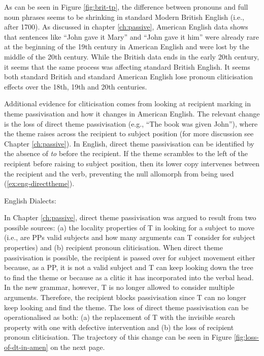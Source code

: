 	As can be seen in Figure \ref{fig:brit-tp}, the difference between pronouns and full noun phrases seems to be shrinking in standard Modern British English (i.e., after 1700). As discussed in chapter \ref{ch:passive}, American English data shows that sentences like ``John gave it Mary'' and ``John gave it him'' were already rare at the beginning of the 19th century in American English and were lost by the middle of the 20th century. While the British data ends in the early 20th century, it seems that the same process was affecting standard British English. It seems both standard British and standard American English lose pronoun cliticisation effects over the 18th, 19th and 20th centuries.

	Additional evidence for cliticisation comes from looking at recipient marking in theme passivisation and how it changes in American English. The relevant change is the loss of direct theme passivisation (e.g., ``The book was given John''), where the theme raises across the recipient to subject position (for more discussion see Chapter \ref{ch:passive}). In English, direct theme passivisation can be identified by the absence of \textit{to} before the recipient. If the theme scrambles to the left of the recipient before raising to subject position, then its lower copy intervenes between the recipient and the verb, preventing the null allomorph from being used (\ref{ex:eng-directtheme}).

\begin{exe}
	 English Dialects:
		\begin{xlist}
		\end{xlist}
\end{exe}
	
	In Chapter \ref{ch:passive}, direct theme passivisation was argued to result from two possible sources: (a) the locality properties of T in looking for a subject to move (i.e., are PPs valid subjects and how many arguments can T consider for subject properties) and (b) recipient pronoun cliticisation. When direct theme passivisation is possible, the recipient is passed over for subject movement either because, as a PP, it is not a valid subject and T can keep looking down the tree to find the theme or because as a clitic it has incorporated into the verbal head. In the new grammar, however, T is no longer allowed to consider multiple arguments. Therefore, the recipient blocks passivisation since T can no longer keep looking and find the theme. The loss of direct theme passivisation can be operationalised as both: (a) the replacement of T with the invisible search property with one with defective intervention and (b) the loss of recipient pronoun cliticisation. The trajectory of this change can be seen in Figure \ref{fig:loss-of-dt-in-amen} on the next page.

